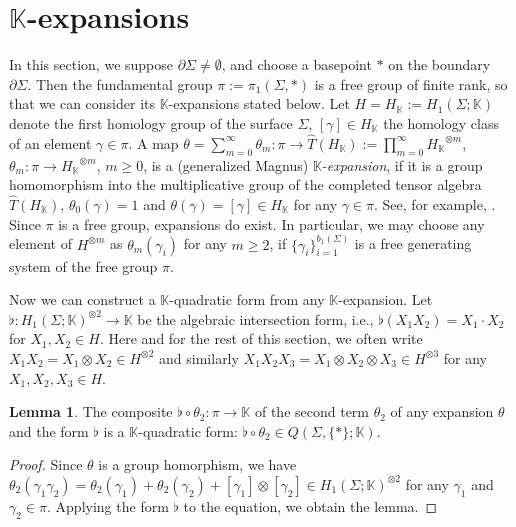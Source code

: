 \documentclass[a4paper,12pt, twoside]{amsart}
\theoremstyle{definition}
\newtheorem{lem}[dfn]{Lemma}
\theoremstyle{remark}
\numberwithin{equation}{section}
\newcommand\bK{{\mathbb{K}}}
\newcommand\HK{H_{\mathbb{K}}}
\newcommand\pa{\partial}
\begin{document}
%
%

\section{$\bK$-expansions}\label{sec:exp}

In this section, we suppose $\pa\Sigma \neq\emptyset$, and choose a basepoint $\ast$ on the boundary $\pa\Sigma$. 
Then the fundamental group $\pi := \pi_1(\Sigma, \ast)$ is a free group of finite rank, so that we can consider its $\bK$-expansions stated below. 
Let $H = \HK := H_1(\Sigma; \bK)$ denote the first homology group of the surface $\Sigma$, $[\gamma] \in \HK$ the homology class of an element $\gamma \in \pi$. 
A map $\theta = \sum^\infty_{m=0}\theta_m: \pi \to \widehat{T}(\HK) := \prod^\infty_{m=0}{\HK}^{\otimes m}$, $\theta_m: \pi \to {\HK}^{\otimes m}$, $m \geq 0$, is a (generalized Magnus) {\it $\bK$-expansion}, if it is a group homomorphism into the multiplicative group of the completed tensor algebra $\widehat{T}(\HK)$, $\theta_0(\gamma) = 1$ and $\theta(\gamma) = [\gamma] \in \HK$ for any $\gamma \in \pi$. See, for example, \cite{Kaw05}. 
Since $\pi$ is a free group, expansions do exist. 
In particular, we may choose any element of $H^{\otimes m}$ as $\theta_m(\gamma_i)$ for any $m \geq 2$, if $\{\gamma_i\}_{i=1}^{b_1(\Sigma)}$ is a free generating system of the free group $\pi$. \par
Now we can construct a $\bK$-quadratic form from any $\bK$-expansion. 
Let $\flat: H_1(\Sigma; \bK)^{\otimes 2} \to \bK$ be the algebraic intersection form, i.e., $\flat(X_1X_2) = X_1\cdot X_2$ for $X_1, X_2 \in H$. 
Here and for the rest of this section, we often write $X_1X_2 = X_1\otimes X_2 \in H^{\otimes 2}$ and similarly $X_1X_2X_3 = X_1\otimes X_2\otimes X_3 \in H^{\otimes 3}$ for any $X_1, X_2, X_3 \in H$. 
\begin{lem}\label{lem:C}
The composite $\flat\circ \theta_2: \pi \to \bK$ of the second term $\theta_2$ of any expansion $\theta$ and the form $\flat$ is a $\bK$-quadratic form: 
$\flat\circ\theta_2 \in Q(\Sigma, \{\ast\}; \bK)$. 
\end{lem}
\begin{proof} Since $\theta$ is a group homorphism, we have 
$\theta_2(\gamma_1\gamma_2) = \theta_2(\gamma_1) + \theta_2(\gamma_2) + [\gamma_1]\otimes [\gamma_2] \in H_1(\Sigma; \bK)^{\otimes 2}$ for any $\gamma_1$ and $\gamma_2 \in \pi$. Applying the form $\flat$ to the equation, we obtain the lemma. 
\end{proof}
\end{document}
